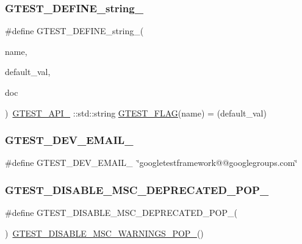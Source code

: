 \subsubsection{\texorpdfstring{GTEST\_DEFINE\_string\_}{GTEST\_DEFINE\_string\_}}
{\footnotesize\ttfamily \#define G\+T\+E\+S\+T\+\_\+\+D\+E\+F\+I\+N\+E\+\_\+string\+\_\+(\begin{DoxyParamCaption}\item[{}]{name,  }\item[{}]{default\+\_\+val,  }\item[{}]{doc }\end{DoxyParamCaption})~\mbox{\hyperlink{_obj__test_2lib_2googletest-release-1_88_81_2googletest_2include_2gtest_2internal_2gtest-port_8h_aa73be6f0ba4a7456180a94904ce17790}{G\+T\+E\+S\+T\+\_\+\+A\+P\+I\+\_\+}} \+::std\+::string \mbox{\hyperlink{_obj__test_2lib_2googletest-release-1_88_81_2googletest_2include_2gtest_2internal_2gtest-port_8h_a828f4e34a1c4b510da50ec1563e3562a}{G\+T\+E\+S\+T\+\_\+\+F\+L\+AG}}(name) = (default\+\_\+val)}

\mbox{\label{_obj__test_2lib_2googletest-release-1_88_81_2googletest_2include_2gtest_2internal_2gtest-port_8h_a21086d276b1a64d6763ee8a94b12c1b8}} 
\subsubsection{\texorpdfstring{GTEST\_DEV\_EMAIL\_}{GTEST\_DEV\_EMAIL\_}}
{\footnotesize\ttfamily \#define G\+T\+E\+S\+T\+\_\+\+D\+E\+V\+\_\+\+E\+M\+A\+I\+L\+\_\+~\char`\"{}googletestframework@@googlegroups.\+com\char`\"{}}

\mbox{\label{_obj__test_2lib_2googletest-release-1_88_81_2googletest_2include_2gtest_2internal_2gtest-port_8h_aa0dc86dc9837f1610e91da65458f53b3}} 
\subsubsection{\texorpdfstring{GTEST\_DISABLE\_MSC\_DEPRECATED\_POP\_}{GTEST\_DISABLE\_MSC\_DEPRECATED\_POP\_}}
{\footnotesize\ttfamily \#define G\+T\+E\+S\+T\+\_\+\+D\+I\+S\+A\+B\+L\+E\+\_\+\+M\+S\+C\+\_\+\+D\+E\+P\+R\+E\+C\+A\+T\+E\+D\+\_\+\+P\+O\+P\+\_\+(\begin{DoxyParamCaption}{ }\end{DoxyParamCaption})~\mbox{\hyperlink{_obj__test_2lib_2googletest-release-1_88_81_2googletest_2include_2gtest_2internal_2gtest-port_8h_ab4c44546d6d9aced68993b87b608fc06}{G\+T\+E\+S\+T\+\_\+\+D\+I\+S\+A\+B\+L\+E\+\_\+\+M\+S\+C\+\_\+\+W\+A\+R\+N\+I\+N\+G\+S\+\_\+\+P\+O\+P\+\_\+}}()}

